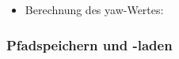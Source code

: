 

\begin{itemize}
  \item Berechnung des yaw-Wertes: 

\end{itemize}





\subsubsection{Pfadspeichern und -laden}

